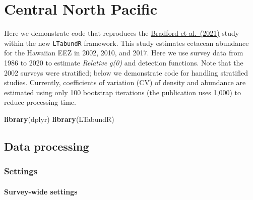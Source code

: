 \documentclass[
]{book}
\newenvironment{Shaded}{\begin{snugshade}}{\end{snugshade}}
\newcommand{\KeywordTok}[1]{\textcolor[rgb]{0.13,0.29,0.53}{\textbf{#1}}}
\newcommand{\NormalTok}[1]{#1}
\begin{document}
\hypertarget{case_cnp}{%
\chapter{Central North Pacific}\label{case_cnp}}

Here we demonstrate code that reproduces the \href{https://repository.library.noaa.gov/view/noaa/29004}{Bradford et al.~(2021)} study within the new \texttt{LTabundR} framework. This study estimates cetacean abundance for the Hawaiian EEZ in 2002, 2010, and 2017. Here we use survey data from 1986 to 2020 to estimate \emph{Relative g(0)} and detection functions. Note that the 2002 surveys were stratified; below we demonstrate code for handling stratified studies. Currently, coefficients of variation (CV) of density and abundance are estimated using only 100 bootstrap iterations (the publication uses 1,000) to reduce processing time.

\begin{Shaded}
\begin{Highlighting}[]
\KeywordTok{library}\NormalTok{(dplyr)}
\KeywordTok{library}\NormalTok{(LTabundR)}
\end{Highlighting}
\end{Shaded}

\hypertarget{data-processing-1}{%
\section*{Data processing}\label{data-processing-1}}

\hypertarget{settings-2}{%
\subsection*{Settings}\label{settings-2}}

\hypertarget{survey-wide-settings-3}{%
\subsubsection*{Survey-wide settings}\label{survey-wide-settings-3}}
\end{document}
